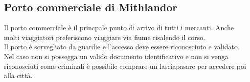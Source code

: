 \subsection{Porto commerciale di Mithlandor}
Il porto commerciale \`e il princpale punto di arrivo di tutti i mercanti. Anche molti viaggiatori preferiscono viaggiare via fiume risalendo il corso.\\
Il porto \`e sorvegliato da guardie e l'accesso deve essere riconosciuto e validato. Nel caso non si possegga un valido documento identificativo e non si venga riconosciuti come criminali \`e possibile comprare un lasciapasare per accedere poi alla citt\`a.